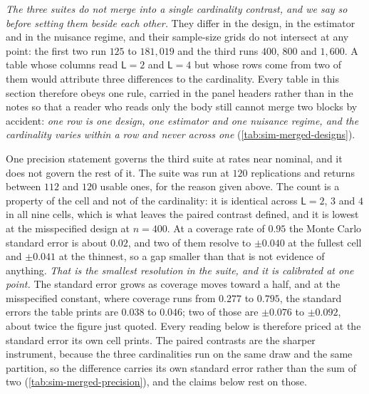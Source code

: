 \documentclass[
  12pt]{article}
\newcommand{\1}[1]{\mathds{1}\left[#1\right]}
\theoremstyle{plain}
\theoremstyle{definition}
\theoremstyle{definition}
\theoremstyle{remark}
\begin{document}
\emph{The three suites do not merge into a single cardinality contrast, and we say so
before setting them beside each other.} They differ in the design, in the
estimator and in the nuisance regime, and their sample-size grids do not
intersect at any point: the first two run $125$ to $181{,}019$ and the third runs
$400$, $800$ and $1{,}600$. A table whose columns read $\mathsf L=2$ and
$\mathsf L=4$ but whose rows come from two of them would attribute three
differences to the cardinality. Every table in this section therefore obeys one
rule, carried in the panel headers rather than in the notes so that a reader who
reads only the body still cannot merge two blocks by accident: \emph{one row is one
design, one estimator and one nuisance regime, and the cardinality varies within a
row and never across one} (\cref{tab:sim-merged-designs}).

One precision statement governs the third suite at rates near nominal, and it
does not govern the rest of it. The suite was run at $120$ replications and
returns between $112$ and $120$ usable ones, for the reason given above. The
count is a property of the cell and not of the cardinality: it is identical
across $\mathsf L=2$, $3$ and $4$ in all nine cells, which is what leaves the
paired contrast defined, and it is lowest at the misspecified design at $n=400$.
At a coverage rate of $0.95$ the Monte Carlo standard error is about $0.02$, and
two of them resolve to $\pm0.040$ at the fullest cell and $\pm0.041$ at the
thinnest, so a gap smaller than that is not evidence of anything. \emph{That is the
smallest resolution in the suite, and it is calibrated at one point.} The
standard error grows as coverage moves toward a half, and at the misspecified
constant, where coverage runs from $0.277$ to $0.795$, the standard errors the
table prints are $0.038$ to $0.046$; two of those are $\pm0.076$ to $\pm0.092$,
about twice the figure just quoted. Every reading below is therefore priced at
the standard error its own cell prints. The paired contrasts are the
sharper instrument, because the three cardinalities run on the same draw and the
same partition, so the difference carries its own standard error rather than the
sum of two (\cref{tab:sim-merged-precision}), and the claims below rest on those.
\end{document}
